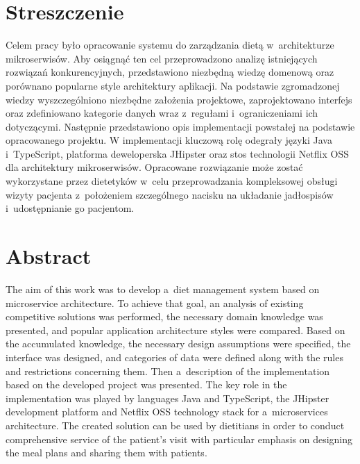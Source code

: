 \chapter*{Streszczenie} %
Celem pracy było opracowanie systemu do zarządzania dietą w~architekturze mikroserwisów.
Aby osiągnąć ten cel przeprowadzono analizę istniejących rozwiązań konkurencyjnych,
przedstawiono niezbędną wiedzę domenową oraz porównano popularne style architektury aplikacji.
Na podstawie zgromadzonej wiedzy wyszczególniono niezbędne założenia projektowe, zaprojektowano interfejs
oraz zdefiniowano kategorie danych wraz z~regułami i~ograniczeniami ich dotyczącymi.
Następnie przedstawiono opis implementacji powstałej na podstawie opracowanego projektu.
W implementacji kluczową rolę odegrały języki Java i~TypeScript, platforma deweloperska JHipster
oraz stos technologii Netflix OSS dla architektury mikroserwisów.
Opracowane rozwiązanie może zostać wykorzystane przez dietetyków w~celu przeprowadzania kompleksowej obsługi wizyty pacjenta
z~położeniem szczególnego nacisku na układanie jadłospisów i~udostępnianie go pacjentom.


\begingroup
\renewcommand{\cleardoublepage}{}
\renewcommand{\clearpage}{}
\chapter*{Abstract} %
The aim of this work was to develop a~diet management system based on microservice architecture.
To achieve that goal, an analysis of existing competitive solutions was performed, the necessary domain knowledge was presented,
and popular application architecture styles were compared.
Based on the accumulated knowledge, the necessary design assumptions were specified, the interface was designed,
and categories of data were defined along with the rules and restrictions concerning them.
Then a~description of the implementation based on the developed project was presented.
The key role in the implementation was played by languages Java and TypeScript,
the JHipster development platform and Netflix OSS technology stack for a~microservices architecture.
The created solution can be used by dietitians in order to conduct comprehensive service of the patient's visit
with particular emphasis on designing the meal plans and sharing them with patients.
\endgroup
{}
